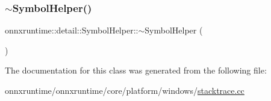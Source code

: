 \mbox{\label{classonnxruntime_1_1detail_1_1SymbolHelper_ab89c81ca228e97f3dd823f7e47fc5159}} 
\subsubsection{\texorpdfstring{$\sim$\+Symbol\+Helper()}{~SymbolHelper()}}
{\footnotesize\ttfamily onnxruntime\+::detail\+::\+Symbol\+Helper\+::$\sim$\+Symbol\+Helper (\begin{DoxyParamCaption}{ }\end{DoxyParamCaption})\hspace{0.3cm}{\ttfamily [inline]}}



The documentation for this class was generated from the following file\+:\begin{DoxyCompactItemize}
\item 
onnxruntime/onnxruntime/core/platform/windows/\mbox{\hyperlink{windows_2stacktrace_8cc}{stacktrace.\+cc}}\end{DoxyCompactItemize}
